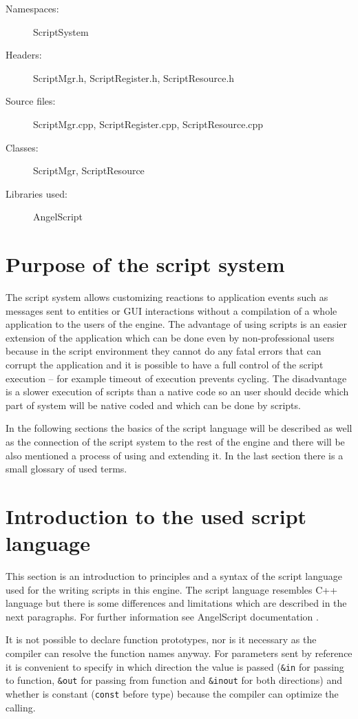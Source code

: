 \begin{description}
  \item[Namespaces:] ScriptSystem
  \item[Headers:] ScriptMgr.h, ScriptRegister.h, ScriptResource.h
  \item[Source files:] ScriptMgr.cpp, ScriptRegister.cpp, ScriptResource.cpp
  \item[Classes:] ScriptMgr, ScriptResource
  \item[Libraries used:] AngelScript
\end{description}

\section{Purpose of the script system}

The script system allows customizing reactions to application events such as messages sent to entities or GUI interactions without a compilation of a whole application to the users of the engine. The advantage of using scripts is an easier extension of the application which can be done even by non-professional users because in the script environment they cannot do any fatal errors that can corrupt the application and it is possible to have a full control of the script execution -- for example timeout of execution prevents cycling. The disadvantage is a slower execution of scripts than a native code so an user should decide which part of system will be native coded and which can be done by scripts.

In the following sections the basics of the script language will be described as well as the connection of the script system to the rest of the engine and there will be also mentioned a process of using and extending it. In the last section there is a small glossary of used terms.

\section{Introduction to the used script language}
\label{sec:script-language}

This section is an introduction to principles and a syntax of the script language used for the writing scripts in this engine. The script language resembles C++ language but there is some differences and limitations which are described in the next paragraphs. For further information see AngelScript documentation \cite{angelscript}.

It is not possible to declare function prototypes, nor is it necessary as the compiler can resolve the function names anyway. For parameters sent by reference it is convenient to specify in which direction the value is passed (\verb/&in/ for passing to function, \verb/&out/ for passing from function and \verb/&inout/ for both directions) and whether is constant (\verb/const/ before type) because the compiler can optimize the calling.

